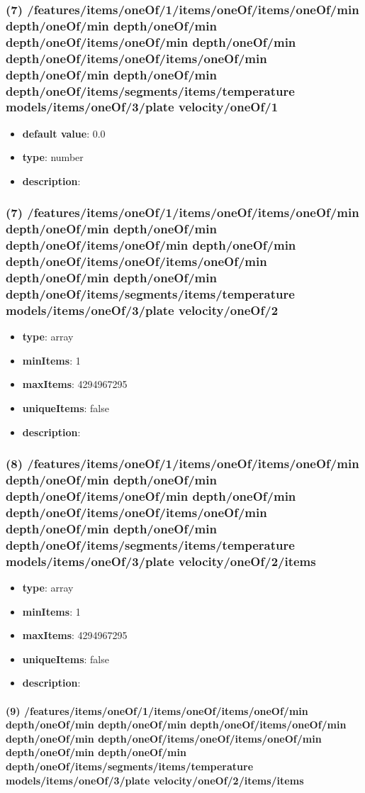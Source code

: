 \subsubsection{(7) /features/items/oneOf/1/items/oneOf/items/oneOf/min depth/oneOf/min depth/oneOf/min depth/oneOf/items/oneOf/min depth/oneOf/min depth/oneOf/items/oneOf/items/oneOf/min depth/oneOf/min depth/oneOf/min depth/oneOf/items/segments/items/temperature models/items/oneOf/3/plate velocity/oneOf/1}
\begin{itemize}[leftmargin=7em]\item {\bf default value}: 0.0
\item {\bf type}: number
\item {\bf description}: 
\end{itemize}\subsubsection{(7) /features/items/oneOf/1/items/oneOf/items/oneOf/min depth/oneOf/min depth/oneOf/min depth/oneOf/items/oneOf/min depth/oneOf/min depth/oneOf/items/oneOf/items/oneOf/min depth/oneOf/min depth/oneOf/min depth/oneOf/items/segments/items/temperature models/items/oneOf/3/plate velocity/oneOf/2}
\begin{itemize}[leftmargin=7em]\item {\bf type}: array
\item {\bf minItems}: 1
\item {\bf maxItems}: 4294967295
\item {\bf uniqueItems}: false
\item {\bf description}: 
\end{itemize}\subsubsection{(8) /features/items/oneOf/1/items/oneOf/items/oneOf/min depth/oneOf/min depth/oneOf/min depth/oneOf/items/oneOf/min depth/oneOf/min depth/oneOf/items/oneOf/items/oneOf/min depth/oneOf/min depth/oneOf/min depth/oneOf/items/segments/items/temperature models/items/oneOf/3/plate velocity/oneOf/2/items}
\begin{itemize}[leftmargin=8em]\item {\bf type}: array
\item {\bf minItems}: 1
\item {\bf maxItems}: 4294967295
\item {\bf uniqueItems}: false
\item {\bf description}: 
\end{itemize}\paragraph{(9) /features/items/oneOf/1/items/oneOf/items/oneOf/min depth/oneOf/min depth/oneOf/min depth/oneOf/items/oneOf/min depth/oneOf/min depth/oneOf/items/oneOf/items/oneOf/min depth/oneOf/min depth/oneOf/min depth/oneOf/items/segments/items/temperature models/items/oneOf/3/plate velocity/oneOf/2/items/items}
